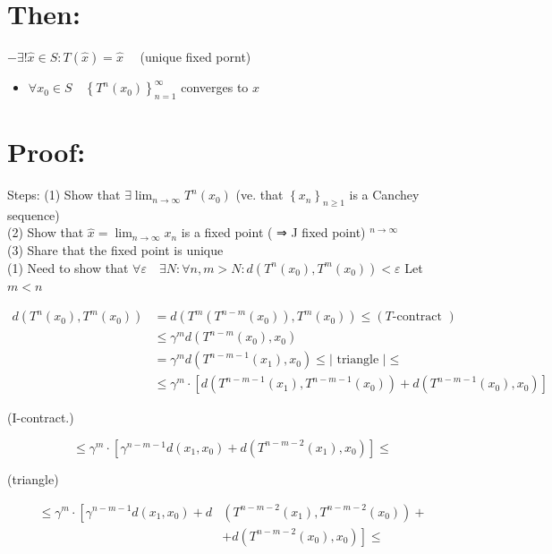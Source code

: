 \documentclass[10pt]{article}
\begin{document}
\section*{Then:}
$-\exists!\hat{x} \in S: T(\hat{x})=\hat{x} \quad$ (unique fixed pornt)

\begin{itemize}
  \item $\forall x_{0} \in S \quad\left\{T^{n}\left(x_{0}\right)\right\}_{n=1}^{\infty}$ converges to $x$
\end{itemize}

\section*{Proof:}
Steps: (1) Show that $\exists \lim _{n \rightarrow \infty} T^{n}\left(x_{0}\right)$ (ve. that $\left\{x_{n}\right\}_{n \geq 1}$ is a Canchey sequence)\\
(2) Show that $\hat{x}=\lim _{n \rightarrow \infty} x_{n}$ is a fixed point ( ⇒ J fixed point) ${ }^{n \rightarrow \infty}$\\
(3) Share that the fixed point is unique\\
(1) Need to show that $\forall \varepsilon \quad \exists N: \forall n, m>N: d\left(T^{n}\left(x_{0}\right), T^{m}\left(x_{0}\right)\right)<\varepsilon$ Let $m<n$

$$
\begin{aligned}
d\left(T^{n}\left(x_{0}\right), T^{m}\left(x_{0}\right)\right) & =d\left(T^{m}\left(T^{n-m}\left(x_{0}\right)\right), T^{m}\left(x_{0}\right)\right) \leqslant(T \text {-contract }) \\
& \leq \gamma^{m} d\left(T^{n-m}\left(x_{0}\right), x_{0}\right) \\
& =\gamma^{m} d\left(T^{n-m-1}\left(x_{1}\right), x_{0}\right) \leqslant \mid \text { triangle } \mid \leqslant \\
& \leqslant \gamma^{m} \cdot\left[d\left(T^{n-m-1}\left(x_{1}\right), T^{n-m-1}\left(x_{0}\right)\right)+d\left(T^{n-m-1}\left(x_{0}\right), x_{0}\right)\right]
\end{aligned}
$$

(I-contract.)

$$
\leqslant \gamma^{m} \cdot\left[\gamma^{n-m-1} d\left(x_{1}, x_{0}\right)+d\left(T^{n-m-2}\left(x_{1}\right), x_{0}\right)\right] \leqslant
$$

(triangle)

$$
\begin{aligned}
\leq \gamma^{m} \cdot\left[\gamma^{n-m-1} d\left(x_{1}, x_{0}\right)+d\right. & \left(T^{n-m-2}\left(x_{1}\right), T^{n-m-2}\left(x_{0}\right)\right)+ \\
& \left.+d\left(T^{n-m-2}\left(x_{0}\right), x_{0}\right)\right] \leqslant
\end{aligned}
$$
\end{document}
